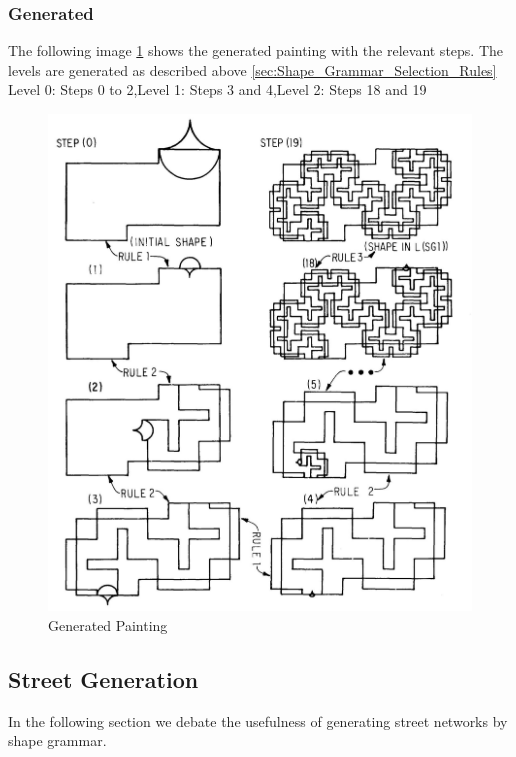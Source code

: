 \documentclass[11pt, a4paper]{report}
\begin{document}
\subsubsection{Generated}
The following image \ref{fig:Shape Grammars/Example} shows the generated painting with the relevant steps. The levels are generated as described above \ref{sec:Shape_Grammar_Selection_Rules} 
\newline
Level 0: Steps 0 to 2,\newline Level 1: Steps 3 and 4,\newline Level 2: Steps 18 and 19
\begin{figure}[!h]
    \centering
    \includegraphics{sg_example.jpg}
    \caption{ Generated Painting\citep{shapeGrammars:1972}}\label{fig:Shape Grammars/Example}
\end{figure}

\pagebreak
\subsection{Street Generation}
In the following section we debate the usefulness of generating street networks by shape grammar. 
\end{document}
